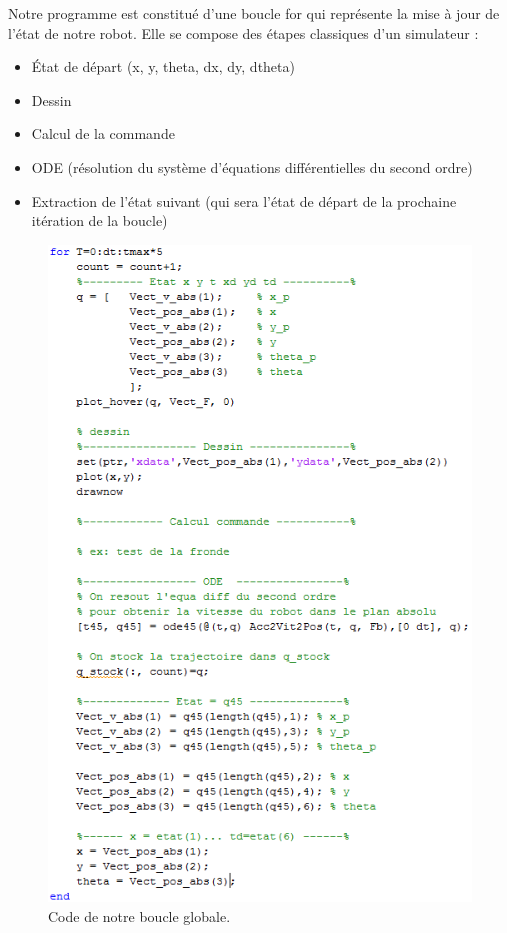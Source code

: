 \documentclass[a4paper,10pt]{article}
\begin{document}
Notre programme est constitué d’une boucle for qui représente la mise à jour de l’état de notre robot. Elle se compose des étapes classiques d’un simulateur :
\begin{itemize}
\item État de départ (x, y, theta, dx, dy, dtheta)
\item Dessin
\item Calcul de la commande
\item ODE (résolution du système d’équations différentielles du second ordre)
\item Extraction de l’état suivant (qui sera l’état de départ de la prochaine itération de la boucle)
\end{itemize}

\begin{figure}[H]
\bigcenter\includegraphics[scale=0.8]{images/boucle_for.png}
\caption{Code de notre boucle globale.}
\end{figure}
\end{document}
